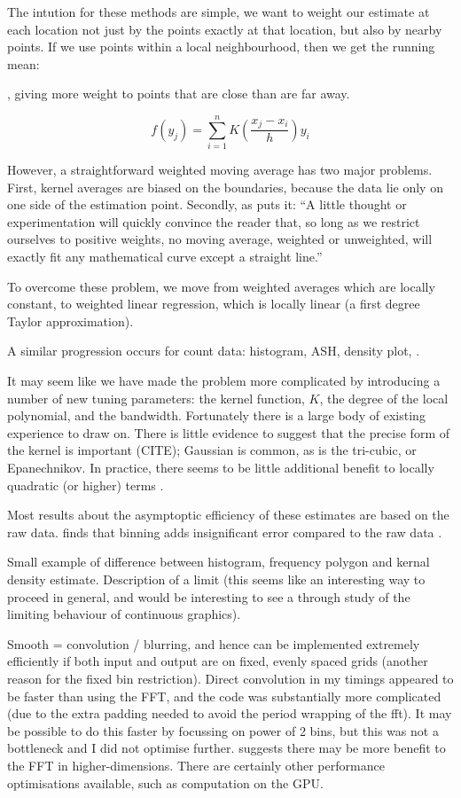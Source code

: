 \documentclass[journal]{vgtc}                %
\begin{document}
The intution for these methods are simple, we want to weight our estimate at each location not just by the points exactly at that location, but also by nearby points. If we use points within a local neighbourhood, then we get the running mean:


, giving more weight to points that are close than are far away.  

\[
  f(y_j) = \sum_{i = 1}^n K( \frac{x_j - x_i}{h} ) y_i 
\]

However, a straightforward weighted moving average has two major problems. First, kernel averages are biased on the boundaries, because the data lie only on one side of the estimation point.  Secondly, as \citep{macaulay:1931} puts it: ``A little thought or experimentation will quickly convince the reader that, so long as we restrict ourselves to positive weights, no moving average, weighted or unweighted, will exactly fit any mathematical curve except a straight line.''

To overcome these problem, we move from weighted averages which are locally constant, to weighted linear regression, which is locally linear (a first degree Taylor approximation).  

A similar progression occurs for count data: histogram, ASH, density plot, .

It may seem like we have made the problem more complicated by introducing a number of new tuning parameters: the kernel function, $K$, the degree of the local polynomial, and the bandwidth. Fortunately there is a large body of existing experience to draw on. There is little evidence to suggest that the precise form of the kernel is important (CITE); Gaussian is common, as is the tri-cubic, or Epanechnikov. In practice, there seems to be little additional benefit to locally quadratic (or higher) terms \citep{cleveland:1996}.

Most results about the asymptoptic efficiency of these estimates are based on the raw data. \cite{wand:1994} finds that binning adds insignificant error compared to the raw data .

Small example of difference between histogram, frequency polygon and kernal density estimate.  Description of a limit (this seems like an interesting way to proceed in general, and would be interesting to see a through study of the limiting behaviour of continuous graphics).


Smooth = convolution / blurring, and hence can be implemented extremely efficiently if both input and output are on fixed, evenly spaced grids (another reason for the fixed bin restriction). Direct convolution in my timings appeared to be faster than using the FFT, and the code was substantially more complicated (due to the extra padding needed to avoid the period wrapping of the fft).  It may be possible to do this faster by focussing on power of 2 bins, but this was not a bottleneck and I did not optimise further. \citep{wand:1994} suggests there may be more benefit to the FFT in higher-dimensions. There are certainly other performance optimisations available, such as computation on the GPU.
\end{document}
